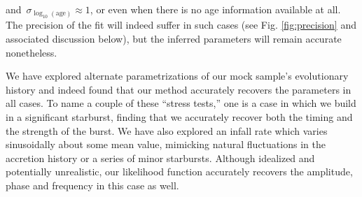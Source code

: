 \documentclass[ms.tex]{subfiles}
\begin{document}
and~$\sigma_{\log_{10}(\text{age})} \approx 1$, or even when there is no age
information available at all.
The precision of the fit will indeed suffer in such cases (see Fig.
\ref{fig:precision} and associated discussion below), but the inferred
parameters will remain accurate nonetheless.
\par
We have explored alternate parametrizations of our mock sample's evolutionary
history and indeed found that our method accurately recovers the parameters
in all cases.
To name a couple of these ``stress tests,'' one is a case in which we build in
a significant starburst, finding that we accurately recover both the timing and
the strength of the burst.
We have also explored an infall rate which varies sinusoidally about some mean
value, mimicking natural fluctuations in the accretion history or a series of
minor starbursts.
Although idealized and potentially unrealistic, our likelihood function
accurately recovers the amplitude, phase and frequency in this case as well.
\end{document}
